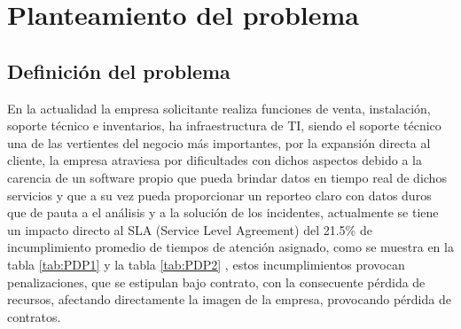 

\chapter{Planteamiento del problema}


\section{Definición del problema}



En la actualidad la empresa solicitante realiza funciones de venta, instalación,  soporte técnico e inventarios, ha infraestructura de TI,  siendo el soporte técnico una de las vertientes del negocio más importantes, por la expansión directa al cliente, la empresa atraviesa  por dificultades con dichos  aspectos debido a la carencia de un software propio que pueda brindar datos en tiempo real de dichos servicios y que a su vez pueda proporcionar un reporteo claro  con datos duros que de pauta a el análisis y a la solución de los incidentes, actualmente se tiene un impacto directo al SLA (Service Level Agreement) del 21.5\%  de incumplimiento promedio de tiempos de atención asignado, como se muestra en la tabla \ref{tab:PDP1} y la tabla \ref{tab:PDP2} ,  estos incumplimientos provocan penalizaciones, que se estipulan bajo contrato, con la consecuente pérdida de recursos, afectando directamente la imagen de la empresa, provocando pérdida de contratos.

